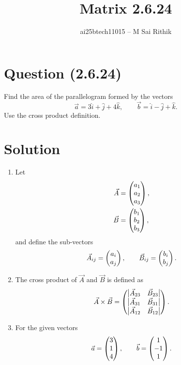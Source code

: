 \documentclass[12pt]{article}
\title{Matrix 2.6.24}
\author{ai25btech11015 -- M Sai Rithik}
\date{}
\begin{document}
\maketitle

\section*{Question (2.6.24)}
Find the area of the parallelogram formed by the vectors
\[
\Vec{a} = 3\hat{i} + \hat{j} + 4\hat{k}, \qquad
\Vec{b} = \hat{i} - \hat{j} + \hat{k}.
\]
Use the cross product definition.

\section*{Solution}

\begin{enumerate}
\item Let
\begin{align}
\Vec{A} &= \begin{pmatrix}a_1 \\ a_2 \\ a_3\end{pmatrix}, \\
\Vec{B} &= \begin{pmatrix}b_1 \\ b_2 \\ b_3\end{pmatrix},
\end{align}
and define the sub-vectors
\begin{align}
\Vec{A}_{ij} = \begin{pmatrix}a_i \\ a_j\end{pmatrix}, \qquad
\Vec{B}_{ij} = \begin{pmatrix}b_i \\ b_j\end{pmatrix}.
\end{align}

\item The cross product of $\Vec{A}$ and $\Vec{B}$ is defined as
\begin{align}
\Vec{A}\times\Vec{B} =
\begin{pmatrix}
  \begin{vmatrix}\Vec{A}_{23} & \Vec{B}_{23}\end{vmatrix} \\
  \begin{vmatrix}\Vec{A}_{31} & \Vec{B}_{31}\end{vmatrix} \\
  \begin{vmatrix}\Vec{A}_{12} & \Vec{B}_{12}\end{vmatrix}
\end{pmatrix}.
\end{align}

\item For the given vectors
\begin{align}
\Vec{a} = \begin{pmatrix}3 \\ 1 \\ 4\end{pmatrix}, \qquad
\Vec{b} = \begin{pmatrix}1 \\ -1 \\ 1\end{pmatrix}.
\end{align}


\end{enumerate}
\end{document}
